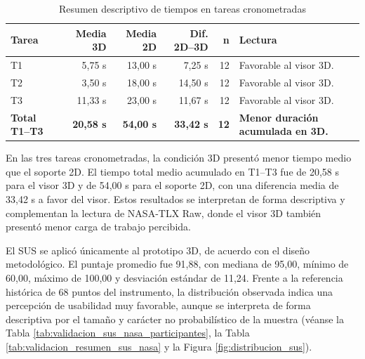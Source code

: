 \begin{table}[H]
    \caption{Resumen descriptivo de tiempos en tareas cronometradas}
    \label{tab:resumen_tiempos_tareas_cronometradas}
    \centering
    \small
    \begin{tabular}{p{2.5cm}rrrrp{4.0cm}}
        \hline
        \textbf{Tarea} & \textbf{Media 3D} & \textbf{Media 2D} & \textbf{Dif. 2D--3D} & \textbf{n} & \textbf{Lectura} \\ \hline
        T1 & 5,75 s & 13,00 s & 7,25 s & 12 & Favorable al visor 3D. \\
        T2 & 3,50 s & 18,00 s & 14,50 s & 12 & Favorable al visor 3D. \\
        T3 & 11,33 s & 23,00 s & 11,67 s & 12 & Favorable al visor 3D. \\
        \textbf{Total T1--T3} & \textbf{20,58 s} & \textbf{54,00 s} & \textbf{33,42 s} & \textbf{12} & \textbf{Menor duración acumulada en 3D.} \\ \hline
    \end{tabular}
    \par\vspace{0.5\baselineskip}
\end{table}

En las tres tareas cronometradas, la condición 3D presentó menor tiempo medio que el soporte 2D. El tiempo total medio acumulado en T1--T3 fue de 20,58 s para el visor 3D y de 54,00 s para el soporte 2D, con una diferencia media de 33,42 s a favor del visor. Estos resultados se interpretan de forma descriptiva y complementan la lectura de NASA-TLX Raw, donde el visor 3D también presentó menor carga de trabajo percibida.

El SUS se aplicó únicamente al prototipo 3D, de acuerdo con el diseño metodológico. El puntaje promedio fue 91,88, con mediana de 95,00, mínimo de 60,00, máximo de 100,00 y desviación estándar de 11,24. Frente a la referencia histórica de 68 puntos del instrumento, la distribución observada indica una percepción de usabilidad muy favorable, aunque se interpreta de forma descriptiva por el tamaño y carácter no probabilístico de la muestra (véanse la Tabla \ref{tab:validacion_sus_nasa_participantes}, la Tabla \ref{tab:validacion_resumen_sus_nasa} y la Figura \ref{fig:distribucion_sus}).

